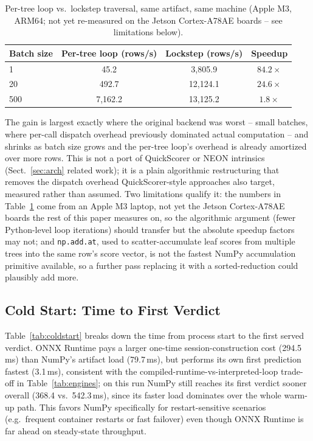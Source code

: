 \documentclass[runningheads]{llncs}
\begin{document}
\begin{table}[htbp]
  \caption{Per-tree loop vs.\ lockstep traversal, same artifact, same machine (Apple M3, ARM64; not yet re-measured on the Jetson Cortex-A78AE boards -- see limitations below).}
  \label{tab:lockstep}
  \centering
  \small
  \begin{tabular}{l c c c}
    \toprule
    Batch size & Per-tree loop (rows/s) & Lockstep (rows/s) & Speedup \\
    \midrule
    1   & 45.2    & 3{,}805.9  & $84.2\times$ \\
    20  & 492.7   & 12{,}124.1 & $24.6\times$ \\
    500 & 7{,}162.2 & 13{,}125.2 & $1.8\times$ \\
    \bottomrule
  \end{tabular}
\end{table}

The gain is largest exactly where the original backend was worst -- small batches, where per-call dispatch overhead previously dominated actual computation -- and shrinks as batch size grows and the per-tree loop's overhead is already amortized over more rows. This is not a port of QuickScorer or NEON intrinsics (Sect.~\ref{sec:arch} related work); it is a plain algorithmic restructuring that removes the dispatch overhead QuickScorer-style approaches also target, measured rather than assumed. Two limitations qualify it: the numbers in Table~\ref{tab:lockstep} come from an Apple M3 laptop, not yet the Jetson Cortex-A78AE boards the rest of this paper measures on, so the algorithmic argument (fewer Python-level loop iterations) should transfer but the absolute speedup factors may not; and \texttt{np.add.at}, used to scatter-accumulate leaf scores from multiple trees into the same row's score vector, is not the fastest NumPy accumulation primitive available, so a further pass replacing it with a sorted-reduction could plausibly add more.

\subsection{Cold Start: Time to First Verdict}

Table~\ref{tab:coldstart} breaks down the time from process start to the first served verdict. ONNX Runtime pays a larger one-time session-construction cost (294.5\,ms) than NumPy's artifact load (79.7\,ms), but performs its own first prediction fastest (3.1\,ms), consistent with the compiled-runtime-vs-interpreted-loop trade-off in Table~\ref{tab:engines}; on this run NumPy still reaches its first verdict sooner overall (368.4 vs.\ 542.3\,ms), since its faster load dominates over the whole warm-up path. This favors NumPy specifically for restart-sensitive scenarios (e.g.\ frequent container restarts or fast failover) even though ONNX Runtime is far ahead on steady-state throughput.
\end{document}
